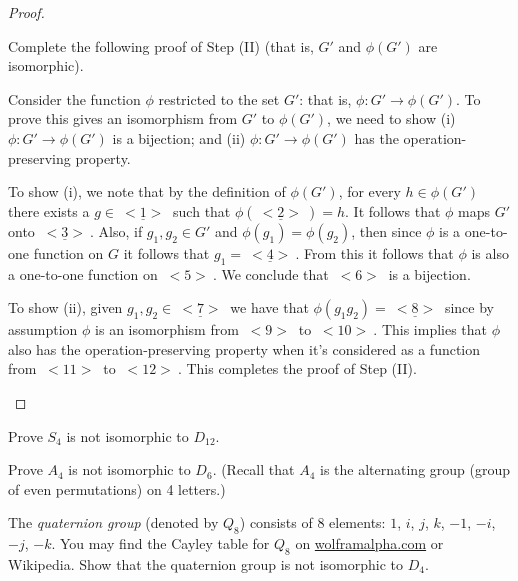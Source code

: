 \begin{proof}
\begin{exercise}{}
Complete the following proof of Step (II) (that is, $G'$ and $\phi(G')$ are isomorphic). 
\medskip

Consider the function $\phi$ restricted to the set $G'$: that is, $\phi: G' \rightarrow \phi(G')$.  To  prove this gives an isomorphism from $G'$ to $\phi(G')$, we need to show (i) $\phi: G' \rightarrow \phi(G')$ is a bijection; and (ii) $\phi: G' \rightarrow \phi(G')$ has the operation-preserving property.

To show (i), we note that by the definition of $\phi(G')$, for every $h \in \phi(G')$ there exists a $g \in \underline{~<1>~}$ such that $\phi(\underline{~<2>~}) = h$. It follows that $\phi$ maps $G'$ onto $\underline{~<3>~}$.  Also, if $g_1, g_2 \in G'$ and $\phi(g_1) = \phi(g_2)$, then since $\phi$ is a one-to-one function on $G$ it follows that $g_1 = \underline{~<4>~}$. From this it follows that $\phi$ is also a one-to-one function on \underline{$~<5>~$}.  We conclude that \underline{$~<6>~$} is a bijection.

To show (ii), given $g_1, g_2 \in \underline{~<7>~}$ we have that $\phi(g_1 g_2) = \underline{~<8>~}$ since by assumption $\phi$ is an isomorphism from \underline{$~<9>~$} to \underline{$~<10>~$}. This implies that $\phi$ also has the operation-preserving  property when it's considered as a function from  \underline{$~<11>~$} to \underline{$~<12>~$}.  This completes the proof of Step (II).
 \end{exercise}

\end{proof}

\begin{exercise}{}
Prove $S_4$ is not isomorphic to $D_{12}$. 
\end{exercise}

\begin{exercise}{}
Prove $A_4$ is not isomorphic to $D_{6}$. (Recall that $A_4$ is the alternating group (group of even permutations) on 4 letters.) 
\end{exercise}

\begin{exercise}{}
The \emph{quaternion group} (denoted by $Q_8$) consists of 8 elements: $1$, $i$, $j$, $k$, $-1$, $-i$, $-j$, $-k$. You may find the Cayley table for $Q_8$ on \url{wolframalpha.com} or Wikipedia. Show that the quaternion group is not isomorphic to $D_4$.
\end{exercise}

